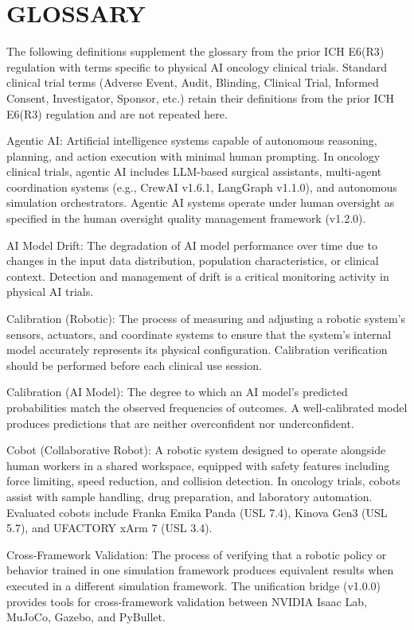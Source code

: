 \documentclass[11pt]{article}
\begin{document}
\section{GLOSSARY}

The following definitions supplement the glossary from the prior ICH E6(R3) regulation with terms specific to physical AI oncology clinical trials. Standard clinical trial terms (Adverse Event, Audit, Blinding, Clinical Trial, Informed Consent, Investigator, Sponsor, etc.) retain their definitions from the prior ICH E6(R3) regulation and are not repeated here.

Agentic AI: Artificial intelligence systems capable of autonomous reasoning, planning, and action execution with minimal human prompting. In oncology clinical trials, agentic AI includes LLM-based surgical assistants, multi-agent coordination systems (e.g., CrewAI v1.6.1, LangGraph v1.1.0), and autonomous simulation orchestrators. Agentic AI systems operate under human oversight as specified in the human oversight quality management framework (v1.2.0).

AI Model Drift: The degradation of AI model performance over time due to changes in the input data distribution, population characteristics, or clinical context. Detection and management of drift is a critical monitoring activity in physical AI trials.

Calibration (Robotic): The process of measuring and adjusting a robotic system's sensors, actuators, and coordinate systems to ensure that the system's internal model accurately represents its physical configuration. Calibration verification should be performed before each clinical use session.

Calibration (AI Model): The degree to which an AI model's predicted probabilities match the observed frequencies of outcomes. A well-calibrated model produces predictions that are neither overconfident nor underconfident.

Cobot (Collaborative Robot): A robotic system designed to operate alongside human workers in a shared workspace, equipped with safety features including force limiting, speed reduction, and collision detection. In oncology trials, cobots assist with sample handling, drug preparation, and laboratory automation. Evaluated cobots include Franka Emika Panda (USL 7.4), Kinova Gen3 (USL 5.7), and UFACTORY xArm 7 (USL 3.4).

Cross-Framework Validation: The process of verifying that a robotic policy or behavior trained in one simulation framework produces equivalent results when executed in a different simulation framework. The unification bridge (v1.0.0) provides tools for cross-framework validation between NVIDIA Isaac Lab, MuJoCo, Gazebo, and PyBullet.
\end{document}
